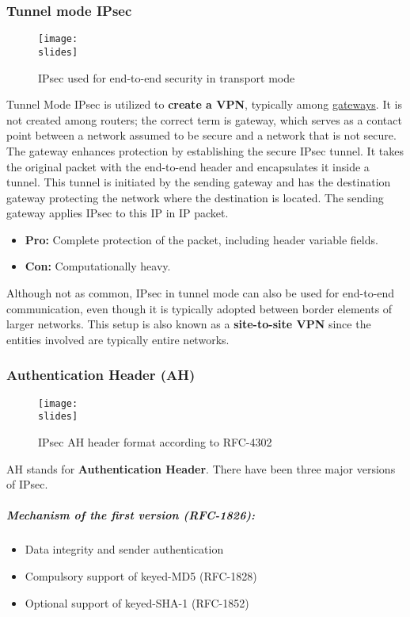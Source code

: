 \subsubsection{Tunnel mode IPsec}
\begin{figure}[h]
    \centering
    \texttt{[image: \\slides]}
    \caption{IPsec used for end-to-end security in transport mode}
\end{figure}

Tunnel Mode IPsec is utilized to \textbf{create a VPN}, typically among \underline{gateways}. It is not created among routers; the correct term is gateway, which serves as a contact point between a network assumed to be secure and a network that is not secure. The gateway enhances protection by establishing the secure IPsec tunnel. It takes the original packet with the end-to-end header and encapsulates it inside a tunnel. This tunnel is initiated by the sending gateway and has the destination gateway protecting the network where the destination is located. The sending gateway applies IPsec to this IP in IP packet.

\begin{itemize}
    \item \textbf{Pro:} Complete protection of the packet, including header variable fields.
    \item \textbf{Con:} Computationally heavy.
\end{itemize}

Although not as common, IPsec in tunnel mode can also be used for end-to-end communication, even though it is typically adopted between border elements of larger networks. This setup is also known as a \textbf{site-to-site VPN} since the entities involved are typically entire networks.


\subsubsection{Authentication Header (AH)}
\begin{figure}[h]
    \centering
    \texttt{[image: \\slides]}
    \caption{IPsec AH header format according to RFC-4302}
\end{figure}

AH stands for \textbf{Authentication Header}. There have been three major versions of IPsec.

\subparagraph{Mechanism of the \textbf{first version} (RFC-1826):}
\begin{itemize}
    \item Data integrity and sender authentication
    \item Compulsory support of keyed-MD5 (RFC-1828)
    \item Optional support of keyed-SHA-1 (RFC-1852)
\end{itemize}


